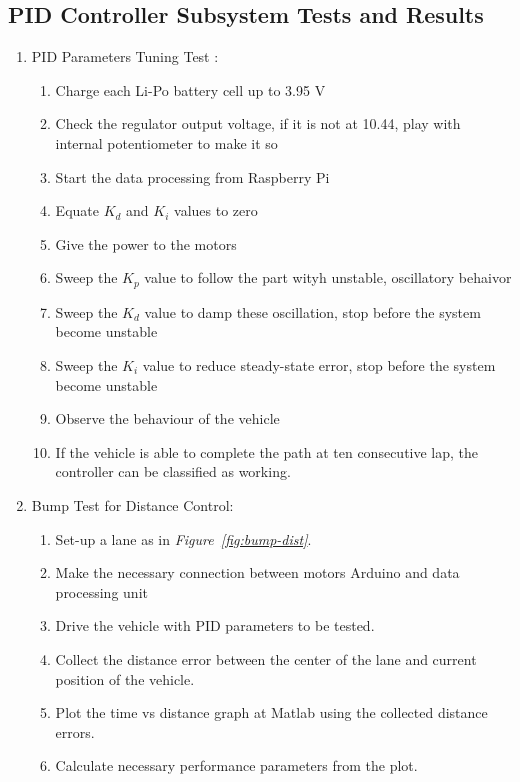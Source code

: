 \documentclass[a4paper,12pt]{article}
\begin{document}
\newpage
\subsection {PID Controller Subsystem Tests and Results}	
\begin{enumerate}
	
	
	
	\item PID Parameters Tuning Test :	 \label{test:a}	
	
	\begin{enumerate}
		\item Charge each Li-Po battery cell  up to 3.95 V
		\item Check the regulator output voltage, if it is not at 10.44, play with internal potentiometer to make it so  
		\item Start the data processing from Raspberry Pi
		\item Equate $K_d$ and $K_i$ values to zero
		\item Give the power to the motors  
		\item Sweep the $K_p$ value to follow the part wityh unstable, oscillatory behaivor
		\item Sweep the $K_d$ value to damp these oscillation, stop before the system become unstable
		\item Sweep the $K_i$ value to reduce steady-state error, stop before the system become unstable	
		\item Observe the behaviour of the vehicle  
		\item If the vehicle is able to complete the path at ten consecutive lap, the controller can be classified as working.  
	\end{enumerate}
	
	
	\item Bump Test for Distance Control: \label{test:b}	
	
	\begin{enumerate}
		\item Set-up a lane as in \textit{Figure~\ref{fig:bump-dist}}.
		\item Make the necessary connection between motors Arduino and data processing unit  
		\item Drive the vehicle with PID parameters to be tested.
		\item Collect the distance error between the center of the lane and current position of the vehicle.
		\item Plot the time vs distance graph at Matlab using the collected distance errors.
		\item Calculate necessary performance parameters from the plot.
	\end{enumerate}
	

\end{enumerate}
\end{document}
